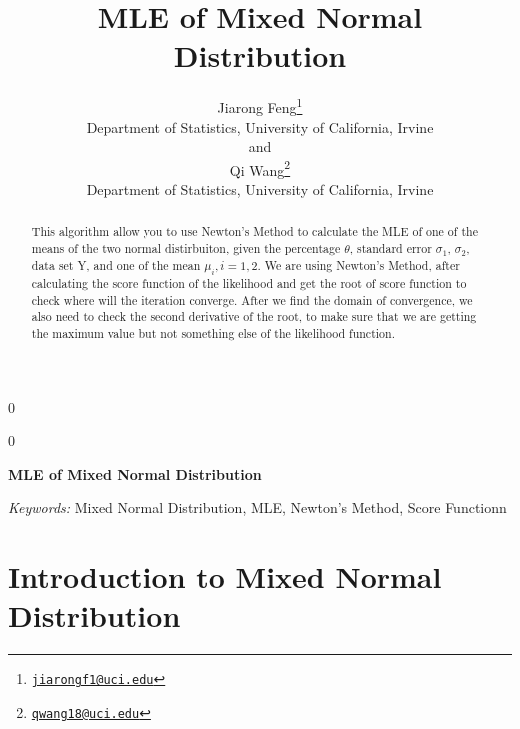 \documentclass[12pt]{article}
\newcommand{\blind}{0}
\begin{document}
\def\spacingset#1{\renewcommand{\baselinestretch}%
{#1}\small\normalsize} \spacingset{1}



\blind
{
  \title{\bf MLE of Mixed Normal Distribution}

  \author{
        Jiarong Feng\footnote{\href{mailto:jiarongf1@uci.edu}{\nolinkurl{jiarongf1@uci.edu}}} \\
    Department of Statistics, University of California, Irvine\\
     and \\     Qi Wang\footnote{\href{mailto:qwang18@uci.edu}{\nolinkurl{qwang18@uci.edu}}} \\
    Department of Statistics, University of California, Irvine\\
      }
  \maketitle
} \fi

\blind
{
  \bigskip
  \bigskip
  \bigskip
  \begin{center}
    {\LARGE\bf MLE of Mixed Normal Distribution}
  \end{center}
  \medskip
} \fi

\bigskip
\begin{abstract}
This algorithm allow you to use Newton's Method to calculate the MLE of
one of the means of the two normal distirbuiton, given the percentage
\(\theta\), standard error \(\sigma_1\), \(\sigma_2\), data set Y, and
one of the mean \(\mu_i, i=1,2\). We are using Newton's Method, after
calculating the score function of the likelihood and get the root of
score function to check where will the iteration converge. After we find
the domain of convergence, we also need to check the second derivative
of the root, to make sure that we are getting the maximum value but not
something else of the likelihood function.
\end{abstract}

\noindent%
{\it Keywords:} Mixed Normal Distribution, MLE, Newton's Method, Score
Functionn
\vfill

\newpage
\spacingset{1.45} %

\section{Introduction to Mixed Normal Distribution}
\end{document}

